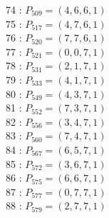 \documentclass{article}
\begin{document}
{\begin{multicols}{3}
74 : $P_{509}=( 4, 6, 6, 1 )$\\
75 : $P_{517}=( 4, 7, 6, 1 )$\\
76 : $P_{520}=( 7, 7, 6, 1 )$\\
77 : $P_{521}=( 0, 0, 7, 1 )$\\
78 : $P_{531}=( 2, 1, 7, 1 )$\\
79 : $P_{533}=( 4, 1, 7, 1 )$\\
80 : $P_{549}=( 4, 3, 7, 1 )$\\
81 : $P_{552}=( 7, 3, 7, 1 )$\\
82 : $P_{556}=( 3, 4, 7, 1 )$\\
83 : $P_{560}=( 7, 4, 7, 1 )$\\
84 : $P_{567}=( 6, 5, 7, 1 )$\\
85 : $P_{572}=( 3, 6, 7, 1 )$\\
86 : $P_{575}=( 6, 6, 7, 1 )$\\
87 : $P_{577}=( 0, 7, 7, 1 )$\\
88 : $P_{579}=( 2, 7, 7, 1 )$\\
\end{multicols}


%


%


}%
\end{document}
